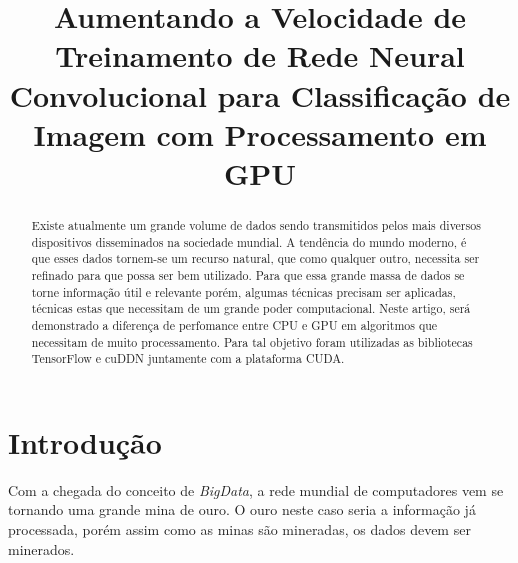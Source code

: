 \documentclass[conference]{IEEEtran}
\begin{document}
	\title{Aumentando a Velocidade de Treinamento de Rede Neural Convolucional para Classifica\c{c}\~ao de Imagem com Processamento em GPU}
	
	\author{
		\and
		\and
		}
	
	\maketitle
	
	\begin{abstract}
		Existe atualmente um grande volume de dados sendo transmitidos pelos mais diversos dispositivos disseminados na sociedade mundial. A tend\^encia do mundo moderno, \'e que esses dados tornem-se um recurso natural, que como qualquer outro, necessita ser refinado para que possa ser bem utilizado. Para que essa grande massa de dados se torne informa\c{c}\~ao \'util e relevante por\'em, algumas técnicas precisam ser aplicadas, t\'ecnicas estas que necessitam de um grande poder computacional. Neste artigo, será demonstrado a diferen\c{c}a de perfomance entre CPU e GPU em algoritmos que necessitam de muito processamento. Para tal objetivo foram utilizadas as bibliotecas TensorFlow e cuDDN juntamente com a plataforma CUDA. 
	\end{abstract}
	
	\IEEEpeerreviewmaketitle
	
	
	\section{Introdu\c{c}\~ao}
	Com a chegada do conceito de \textit{BigData}, a rede mundial de computadores vem se tornando uma grande mina de ouro. O ouro neste caso seria a informa\c{c}\~ao j\'a processada, por\'em assim como as minas s\~ao mineradas, os dados devem ser minerados.
	
\end{document}
